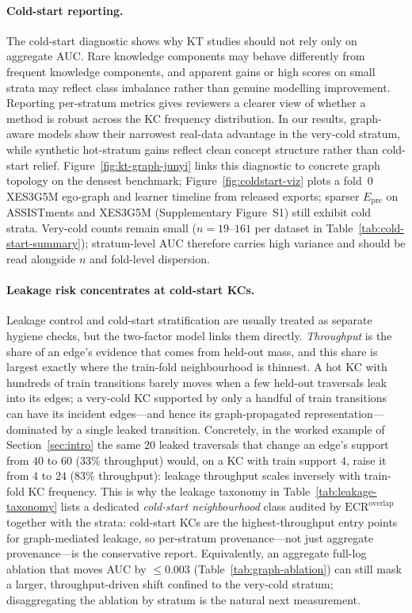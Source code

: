 \documentclass[pdflatex,sn-mathphys-num]{sn-jnl}
\newcommand{\Epre}{\ensuremath{E_{\text{pre}}}}
\newcommand{\KCs}{knowledge components}
\newenvironment{revbox}{}{}
\begin{document}
\paragraph{Cold-start reporting.}
The cold-start diagnostic shows why KT studies should not rely only on
aggregate AUC. Rare \KCs{} may behave differently from frequent
\KCs{}, and apparent gains or high scores on small strata may reflect
class imbalance rather than genuine modelling improvement. Reporting
per-stratum metrics gives reviewers a clearer view of whether a method
is robust across the KC frequency distribution. In our results,
graph-aware models show their narrowest real-data advantage in the
very-cold stratum, while synthetic hot-stratum gains reflect clean
concept structure rather than cold-start relief.
Figure~\ref{fig:kt-graph-junyi} links this diagnostic to concrete graph
topology on the densest benchmark; Figure~\ref{fig:coldstart-viz} plots a
fold~0 XES3G5M ego-graph and learner timeline from released exports; sparser
$\Epre$ on ASSISTments and XES3G5M (Supplementary Figure~S1) still exhibit
cold strata. Very-cold counts remain small ($n{=}19$--$161$ per dataset in
Table~\ref{tab:cold-start-summary}); stratum-level AUC therefore carries high
variance and should be read alongside $n$ and fold-level dispersion.

\begin{revbox}
\paragraph{Leakage risk concentrates at cold-start KCs.}
Leakage control and cold-start stratification are usually treated as separate
hygiene checks, but the two-factor model links them directly. \emph{Throughput}
is the share of an edge's evidence that comes from held-out mass, and this share
is largest exactly where the train-fold neighbourhood is thinnest. A hot KC with
hundreds of train transitions barely moves when a few held-out traversals leak
into its edges; a very-cold KC supported by only a handful of train transitions
can have its incident edges---and hence its graph-propagated representation---
dominated by a single leaked transition. Concretely, in the worked example of
Section~\ref{sec:intro} the same $20$ leaked traversals that change an edge's
support from $40$ to $60$ ($33\%$ throughput) would, on a KC with train support
$4$, raise it from $4$ to $24$ ($83\%$ throughput): leakage throughput scales
inversely with train-fold KC frequency. This is why the leakage taxonomy in
Table~\ref{tab:leakage-taxonomy} lists a dedicated \emph{cold-start
neighbourhood} class audited by $\mathrm{ECR}^{\mathrm{overlap}}$ together with
the strata: cold-start KCs are the highest-throughput entry points for
graph-mediated leakage, so per-stratum provenance---not just aggregate
provenance---is the conservative report. Equivalently, an aggregate full-log
ablation that moves AUC by ${\leq}0.003$ (Table~\ref{tab:graph-ablation}) can
still mask a larger, throughput-driven shift confined to the very-cold stratum;
disaggregating the ablation by stratum is the natural next measurement.
\end{revbox}
\end{document}
